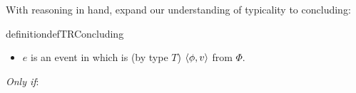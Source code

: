 \begin{note}
  With reasoning in hand, expand our understanding of typicality to concluding:

  \begin{restatable}[\tC{2}]{definition}{defTRConcluding}
    \label{def:tC}

    \noindent%

    \begin{itemize}
    \item
      \(e\) is an event in which \vAgent{} is \emph{} (by type \(T\)) \(\langle \phi, v \rangle\) from \(\Phi\).
    \end{itemize}

    \emph{Only if}:


\end{restatable}
\end{note}

